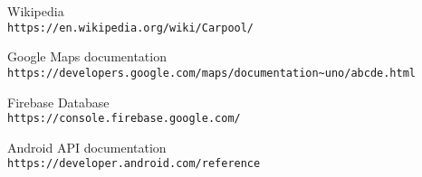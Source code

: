 \begin{thebibliography}{9}
Wikipedia
\\\texttt{https://en.wikipedia.org/wiki/Carpool/}

Google Maps documentation 
\\\texttt{https://developers.google.com/maps/documentation\~{}uno/abcde.html}

Firebase Database 
\\\texttt{https://console.firebase.google.com/}

Android API documentation
\\\texttt{https://developer.android.com/reference}

\end{thebibliography}